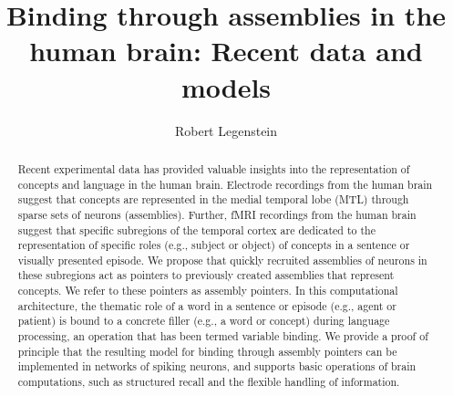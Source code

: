 \documentclass{article}
\title{Binding through assemblies in the human brain: Recent data and models}
\author{Robert Legenstein}
\date{}
\begin{document}
\maketitle
\thispagestyle{empty}
\begin{abstract}
Recent experimental data has provided valuable insights into the representation of concepts and language in the human brain. Electrode recordings from the human brain suggest that concepts are represented in the medial temporal lobe (MTL) through sparse sets of neurons (assemblies). Further, fMRI recordings from the human brain suggest that specific subregions of the temporal cortex are dedicated to the representation of specific roles (e.g., subject or object) of concepts in a sentence or visually presented episode. We propose that quickly recruited assemblies of neurons in these subregions act as pointers  to previously created assemblies that represent concepts. We refer to these pointers as assembly pointers. In this computational architecture, the thematic role of a word in a sentence or episode (e.g., agent or patient) is bound to a concrete filler (e.g., a word or concept) during language processing, an operation that has been termed variable binding. We provide a proof of principle that the resulting model for binding through assembly pointers can be implemented in networks of spiking neurons, and supports basic operations of brain computations, such as structured recall and the flexible handling of information.
\end{abstract}
\end{document}
